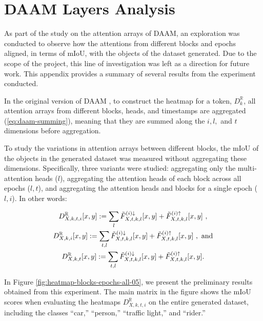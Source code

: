 \appendix           %
\appendixpage  		%
\addappheadtotoc 	%

\chapter{DAAM Layers Analysis}
\label{chap:appendix-c1}

As part of the study on the attention arrays of DAAM, an exploration was conducted to observe how the attentions from different blocks and epochs aligned, in terms of mIoU, with the objects of the dataset generated. Due to the scope of the project, this line of investigation was left as a direction for future work. This appendix provides a summary of several results from the experiment conducted.

In the original version of DAAM \cite{DAAM}, to construct the heatmap for a token, $D^\mathbb{R}_k$, all attention arrays from different blocks, heads, and timestamps are aggregated (\ref{eq:daam-summing}), meaning that they are summed along the $i, l,$ and $t$ dimensions before aggregation.

To study the variations in attention arrays between different blocks, the mIoU of the objects in the generated dataset was measured without aggregating these dimensions. Specifically, three variants were studied: aggregating only the multi-attention heads ($l$), aggregating the attention heads of each block across all epochs ($l, t$), and aggregating the attention heads and blocks for a single epoch ($l, i$). In other words:

\begin{equation}
\label{eq:daam-not-aggregated}
\begin{gathered}
D_{X,k,t, i}^{\mathbb{R}}[x, y] := \sum_{l} \Tilde{F}_{X, t, k, l}^{(i) \downarrow}[x,y] + \Tilde{F}_{X, t, k, l}^{(i) \uparrow}[x,y]\ , \\
D_{X,k, i}^{\mathbb{R}}[x, y] := \sum_{t, l} \Tilde{F}_{X, t, k, l}^{(i) \downarrow}[x,y] + \Tilde{F}_{X, t, k, l}^{(i) \uparrow}[x,y]\ ,\  \text{and} \\ 
D_{X,k, t}^{\mathbb{R}}[x, y] := \sum_{t, l} \Tilde{F}_{X, t, k, l}^{(i) \downarrow}[x,y] + \Tilde{F}_{X, t, k, l}^{(i) \uparrow}[x,y].
\end{gathered}
\end{equation}

In Figure \ref{fig:heatmap-blocks-epochs-all-05}, we present the preliminary results obtained from this experiment. The main matrix in the figure shows the mIoU scores when evaluating the heatmaps $D_{X,k,t, i}^{\mathbb{R}}$ on the entire generated dataset, including the classes ``car,'' ``person,'' ``traffic light,'' and ``rider.''

